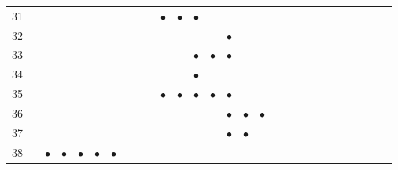 \documentclass[text.tex]{subfiles}
\begin{document}
\begin{table}
{\begin{tabular}{l|ccccccccccccccccccccccccccc}
31  &           &           &           &           &           &           &           &           &           & $\bullet$ & $\bullet$ & $\bullet$ &           &           &           &           &           &           &           &           &           &           &           &           &           &           &           \\
32  &           &           &           &           &           &           &           &           &           &           &           &           &           & $\bullet$ &           &           &           &           &           &           &           &           &           &           &           &           &           \\
33  &           &           &           &           &           &           &           &           &           &           &           & $\bullet$ & $\bullet$ & $\bullet$ &           &           &           &           &           &           &           &           &           &           &           &           &           \\
34  &           &           &           &           &           &           &           &           &           &           &           & $\bullet$ &           &           &           &           &           &           &           &           &           &           &           &           &           &           &           \\
35  &           &           &           &           &           &           &           &           &           & $\bullet$ & $\bullet$ & $\bullet$ & $\bullet$ & $\bullet$ &           &           &           &           &           &           &           &           &           &           &           &           &           \\
36  &           &           &           &           &           &           &           &           &           &           &           &           &           & $\bullet$ & $\bullet$ & $\bullet$ &           &           &           &           &           &           &           &           &           &           &           \\
37  &           &           &           &           &           &           &           &           &           &           &           &           &           & $\bullet$ & $\bullet$ &           &           &           &           &           &           &           &           &           &           &           &           \\
38  &           & $\bullet$ & $\bullet$ & $\bullet$ & $\bullet$ & $\bullet$ &           &           &           &           &           &           &           &           &           &           &           &           &           &           &           &           &           &           &           &           &           \\

\end{tabular}}
\end{table}
\end{document}
